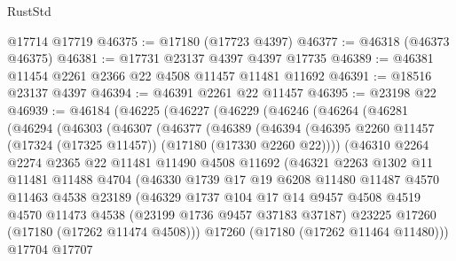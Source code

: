 \begin{lexlean}{RustStd}
\begin{coremodule}
{\begin{coremodule}
{{{{{{{{{{{{{{{{{{{{{{{{{{{{{{{{{{{{{{{{{{{{{{{{{{{{{{{    @17714
    @17719
@46375 := @17180 (@17723 @4397)
@46377 := @46318 (@46373 @46375)
@46381 := @17731 @23137 @4397 @4397 @17735
@46389 := @46381 @11454 @2261 @2366 @22 @4508 @11457 @11481 @11692
@46391 := @18516 @23137 @4397
@46394 := @46391 @2261 @22 @11457
@46395 := @23198 @22
@46939 := @46184
    (@46225
      (@46227
        (@46229
          (@46246
            (@46264
              (@46281
                (@46294
                  (@46303
                    (@46307
                      (@46377
                        (@46389
                          (@46394
                            (@46395
                              @2260
                              @11457
                              (@17324 (@17325 @11457))
                              (@17180 (@17330 @2260 @22))))
                          (@46310
                            @2264
                            @2274
                            @2365
                            @22
                            @11481
                            @11490
                            @4508
                            @11692
                            (@46321
                              @2263
                              @1302
                              @11
                              @11481
                              @11488
                              @4704
                              (@46330
                                @1739
                                @17
                                @19
                                @6208
                                @11480
                                @11487
                                @4570
                                @11463
                                @4538
                                @23189
                                (@46329
                                  @1737
                                  @104
                                  @17
                                  @14
                                  @9457
                                  @4508
                                  @4519
                                  @4570
                                  @11473
                                  @4538
                                  (@23199 @1736 @9457 @37183 @37187)
                                  @23225
                                  @17260
                                  (@17180 (@17262 @11474 @4508)))
                                @17260
                                (@17180 (@17262 @11464 @11480)))
                              @17704
                              @17707
}}}}}}}}}}}}}}}}}}}}}}}}}}}}}}}}}}}}}}}}}}}}}}}}}}}}}}}
\end{coremodule}}
\end{coremodule}
\end{lexlean}
